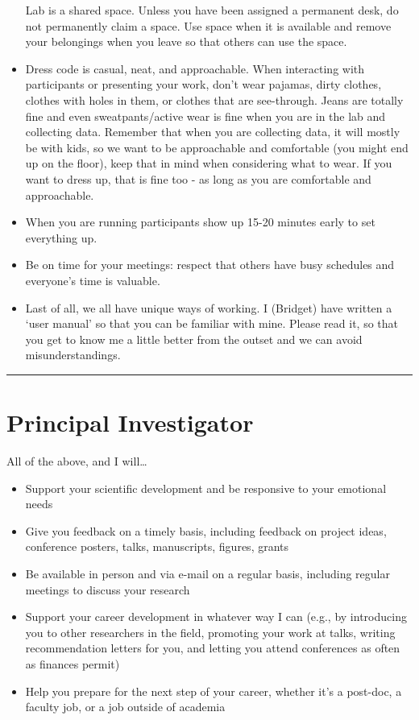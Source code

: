 \documentclass[]{book}
\providecommand{\tightlist}{%
  \setlength{\itemsep}{0pt}\setlength{\parskip}{0pt}}
\begin{document}
\begin{itemize}
  Lab is a shared space. Unless you have been assigned a permanent desk, do not permanently claim a space. Use space when it is available and remove your belongings when you leave so that others can use the space.
\item
  Dress code is casual, neat, and approachable. When interacting with participants or presenting your work, don't wear pajamas, dirty clothes, clothes with holes in them, or clothes that are see-through. Jeans are totally fine and even sweatpants/active wear is fine when you are in the lab and collecting data. Remember that when you are collecting data, it will mostly be with kids, so we want to be approachable and comfortable (you might end up on the floor), keep that in mind when considering what to wear. If you want to dress up, that is fine too - as long as you are comfortable and approachable.
\item
  When you are running participants show up 15-20 minutes early to set everything up.
\item
  Be on time for your meetings: respect that others have busy schedules and everyone's time is valuable.
\item
  Last of all, we all have unique ways of working. I (Bridget) have written a `user manual' so that you can be familiar with mine. Please read it, so that you get to know me a little better from the outset and we can avoid misunderstandings.
\end{itemize}

\begin{center}\rule{0.5\linewidth}{\linethickness}\end{center}

\hypertarget{principal-investigator}{%
\section{Principal Investigator}\label{principal-investigator}}

All of the above, and I will\ldots{}

\begin{itemize}
\tightlist
\item
  Support your scientific development and be responsive to your emotional needs
\item
  Give you feedback on a timely basis, including feedback on project ideas, conference posters, talks, manuscripts, figures, grants
\item
  Be available in person and via e-mail on a regular basis, including regular meetings to discuss your research
\item
  Support your career development in whatever way I can (e.g., by introducing you to other researchers in the field, promoting your work at talks, writing recommendation letters for you, and letting you attend conferences as often as finances permit)
\item
  Help you prepare for the next step of your career, whether it's a post-doc, a faculty job, or a job outside of academia
\end{itemize}
\end{document}
